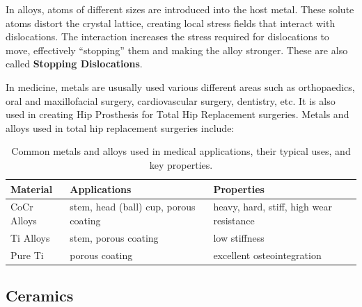 \documentclass[12pt]{article}
\begin{document}
In alloys, atoms of different sizes are introduced into the host metal. These
solute atoms distort the crystal lattice, creating local stress fields that
interact with dislocations. The interaction increases the stress required for
dislocations to move, effectively “stopping” them and making the alloy
stronger. These are also called \textbf{Stopping Dislocations}.

In medicine, metals are ususally used various different areas such as
orthopaedics, oral and maxillofacial surgery, cardiovascular surgery,
dentistry, etc. It is also used in creating Hip Prosthesis for Total Hip
Replacement surgeries. Metals and alloys used in total hip replacement
surgeries include:
\begin{table}[htbp]
    \centering
    \begin{tabular}{>{\raggedright\arraybackslash}p{2.5cm}>{\raggedright\arraybackslash}p{4cm}>{\raggedright\arraybackslash}p{4cm}}
        \toprule
        Material    & Applications                          & Properties                               \\
        \midrule
        CoCr Alloys & stem, head (ball) cup, porous coating & heavy, hard, stiff, high wear resistance \\
        Ti Alloys   & stem, porous coating                  & low stiffness                            \\
        Pure Ti     & porous coating                        & excellent osteointegration               \\
        \bottomrule
    \end{tabular}
    \caption{Common metals and alloys used in medical applications, their typical uses, and key properties.}\label{tab:medical_metals}
\end{table}

\subsection{Ceramics}
\end{document}
